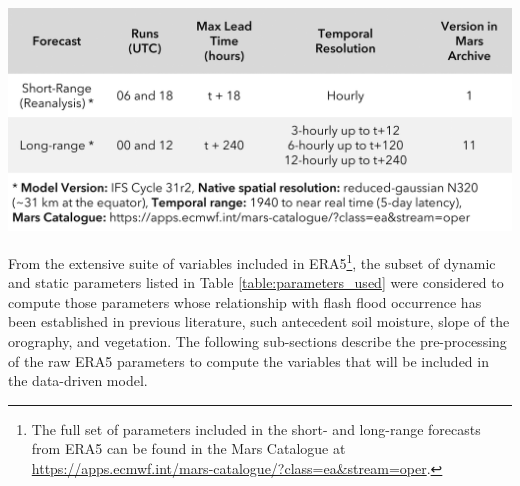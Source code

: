 \begin{table}[htbp]
\centering
{}
\includegraphics[width=\textwidth]{01_forecasts_types.png}
\label{table:forecasts_types}
\end{table}

From the extensive suite of variables included in ERA5\footnote {The full set of parameters included in the short- and long-range forecasts from ERA5 can be found in the Mars Catalogue at \url{https://apps.ecmwf.int/mars-catalogue/?class=ea&stream=oper}.}, the subset of dynamic and static parameters listed in Table \ref{table:parameters_used} were considered to compute those parameters whose relationship with flash flood occurrence has been established in previous literature, such antecedent soil moisture, slope of the orography, and vegetation. The following sub-sections describe the pre-processing of the raw ERA5 parameters to compute the variables that will be included in the data-driven model.

